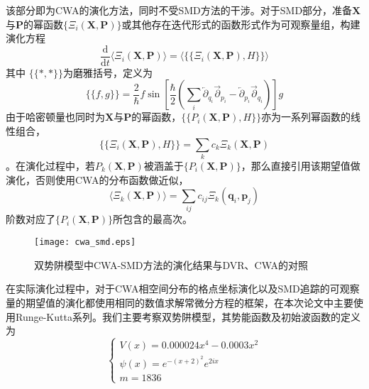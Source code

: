 该部分即为CWA的演化方法，同时不受SMD方法的干涉。对于SMD部分，准备$\boldsymbol{X}$与$\boldsymbol{P}$的幂函数$\{\Xi_i(\boldsymbol{X},\boldsymbol{P})\}$或其他存在迭代形式的函数形式作为可观察量组，构建演化方程
\begin{equation}
\frac{\mathrm{d}}{\mathrm{d} t} \langle \Xi_i(\boldsymbol{X},\boldsymbol{P}) \rangle = \langle \{\{\Xi_i(\boldsymbol{X},\boldsymbol{P}), H\}\} \rangle
\end{equation}
其中 $\{\{ *, * \}\}$为磨雅括号，定义为
 \begin{equation}
	 \{\{f, g\}\}=\frac{2}{\hbar} f \sin \left[\frac{\hbar}{2}\left(\sum_{i} \overleftarrow{\partial}_{q_{i}} \overrightarrow{\partial}_{p_{i}}-\overleftarrow{\partial}_{p_{i}} \overrightarrow{\partial}_{q_{i}}\right)\right] g
\end{equation}
由于哈密顿量也同时为$\boldsymbol{X}$与$\boldsymbol{P}$的幂函数，$\{\{P_i(\boldsymbol{X},\boldsymbol{P}), H\}\}$亦为一系列幂函数的线性组合，
\begin{equation}
\{\{\Xi_i(\boldsymbol{X},\boldsymbol{P}), H\}\} = \sum_k c_k \Xi_k(\boldsymbol{X},\boldsymbol{P})
\end{equation}
。在演化过程中，若$P_k(\boldsymbol{X},\boldsymbol{P})$被涵盖于$\{P_i(\boldsymbol{X},\boldsymbol{P})\}$，那么直接引用该期望值做演化，否则使用CWA的分布函数做近似，
\begin{equation}
\langle \Xi_k(\boldsymbol{X},\boldsymbol{P}) \rangle = \sum_{ij} c_{ij} \Xi_k(\boldsymbol{q}_i,\boldsymbol{p}_j)
\end{equation}
阶数对应了$\{P_i(\boldsymbol{X},\boldsymbol{P})\}$所包含的最高次。 

\begin{figure}
\centering
\texttt{[image: cwa\_smd.eps]}
\caption{双势阱模型中CWA-SMD方法的演化结果与DVR、CWA的对照}
\label{cwa-smd-double-well}
\end{figure}

在实际演化过程中，对于CWA相空间分布的格点坐标演化以及SMD追踪的可观察量的期望值的演化都使用相同的数值求解常微分方程的框架，在本次论文中主要使用Runge-Kutta系列。我们主要考察双势阱模型，其势能函数及初始波函数的定义为
\begin{equation}
\begin{cases}
V(x) = 0.000024 x^4 - 0.0003 x^2 \\
\psi(x) = e^{-(x+2)^2} e^{2ix} \\
m = 1836
\end{cases}
\end{equation}

